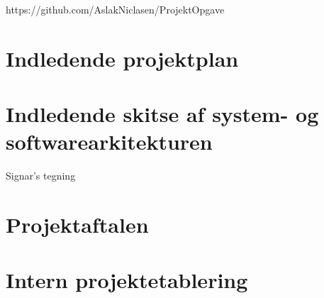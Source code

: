 \documentclass[a4paper,12pt]{article}
\begin{document}
https://github.com/AslakNiclasen/ProjektOpgave

\section{Indledende projektplan}

\section{Indledende skitse af system- og softwarearkitekturen}

Signar's tegning 

\section{Projektaftalen}

\section{Intern projektetablering}
\end{document}
